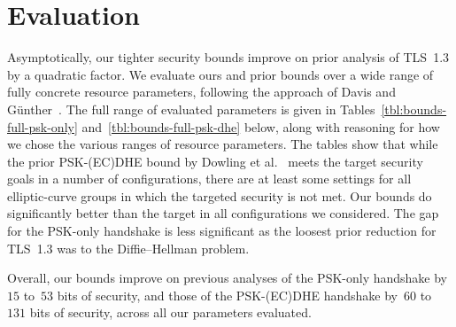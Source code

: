 \section{Evaluation}
\label{sec:evaluation}
Asymptotically, our tighter security bounds improve on prior analysis of TLS~1.3 by a quadratic factor.
We evaluate ours and prior bounds over a wide range of fully concrete resource parameters, following the approach of Davis and Günther~\cite{ACNS:DavGun21}.
\iffull
	The
full range of evaluated parameters is given in 
	Tables~\ref{tbl:bounds-full-psk-only} and~\ref{tbl:bounds-full-psk-dhe} 
		below,
along with reasoning for how we chose the various ranges of resource parameters.
The tables show that while the prior PSK-(EC)DHE bound by Dowling et al.~\cite{JC:DFGS21} meets the target security goals in a number of configurations,
there are at least some settings for all elliptic-curve groups in which the targeted security is not met.
Our bounds do significantly better than the target in all configurations we considered.
The gap for the PSK-only handshake is less significant as the loosest prior reduction for TLS~1.3 was to the Diffie--Hellman problem.

Overall, our bounds improve on previous analyses of the PSK-only handshake by~$15$ to~$53$ bits of security, and those of the PSK-(EC)DHE handshake by~$60$ to~$131$ bits of security, across all our parameters evaluated.

	



	

